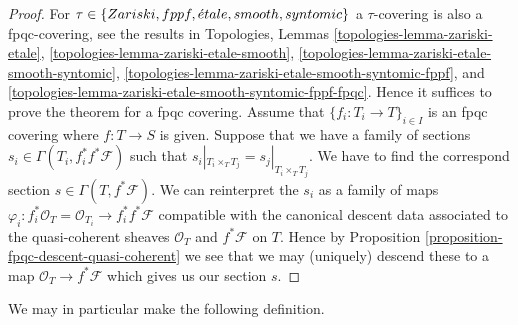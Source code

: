 \begin{proof}
For $\tau \in \{Zariski, \linebreak[0] fppf, \linebreak[0] \acute{e}tale,
\linebreak[0] smooth, \linebreak[0] syntomic\}$ a $\tau$-covering
is also a fpqc-covering, see the results in
Topologies, Lemmas
\ref{topologies-lemma-zariski-etale},
\ref{topologies-lemma-zariski-etale-smooth},
\ref{topologies-lemma-zariski-etale-smooth-syntomic},
\ref{topologies-lemma-zariski-etale-smooth-syntomic-fppf}, and
\ref{topologies-lemma-zariski-etale-smooth-syntomic-fppf-fpqc}.
Hence it suffices to prove the theorem
for a fpqc covering. Assume that $\{f_i : T_i \to T\}_{i \in I}$
is an fpqc covering where $f : T \to S$ is given. Suppose that
we have a family of sections $s_i \in \Gamma(T_i , f_i^*f^*\mathcal{F})$
such that $s_i|_{T_i \times_T T_j} = s_j|_{T_i \times_T T_j}$.
We have to find the correspond section $s \in \Gamma(T, f^*\mathcal{F})$.
We can reinterpret the $s_i$ as a family of maps
$\varphi_i : f_i^*\mathcal{O}_T = \mathcal{O}_{T_i} \to f_i^*f^*\mathcal{F}$
compatible with the canonical descent data associated to the
quasi-coherent sheaves $\mathcal{O}_T$ and $f^*\mathcal{F}$ on $T$.
Hence by Proposition \ref{proposition-fpqc-descent-quasi-coherent}
we see that we may (uniquely) descend
these to a map $\mathcal{O}_T \to f^*\mathcal{F}$ which gives
us our section $s$.
\end{proof}

\noindent
We may in particular make the following definition.

